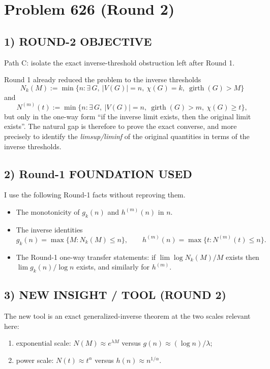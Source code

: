 \section{Problem 626 (Round 2)}

\subsection*{1) ROUND-2 OBJECTIVE}

Path C: isolate the exact inverse-threshold obstruction left after Round 1.

Round 1 already reduced the problem to the inverse thresholds
\[
N_k(M):=\min\{n:\exists\,G,\ |V(G)|=n,\ \chi(G)=k,\ \operatorname{girth}(G)>M\}
\]
and
\[
N^{(m)}(t):=\min\{n:\exists\,G,\ |V(G)|=n,\ \operatorname{girth}(G)>m,\ \chi(G)\ge t\},
\]
but only in the one-way form ``if the inverse limit exists, then the original limit exists''.
The natural gap is therefore to prove the exact converse, and more precisely to identify the
\emph{limsup/liminf} of the original quantities in terms of the inverse thresholds.

\subsection*{2) Round-1 FOUNDATION USED}

I use the following Round-1 facts without reproving them.

\begin{itemize}
\item The monotonicity of \(g_k(n)\) and \(h^{(m)}(n)\) in \(n\).
\item The inverse identities
\[
g_k(n)=\max\{M:N_k(M)\le n\},\qquad
h^{(m)}(n)=\max\{t:N^{(m)}(t)\le n\}.
\]
\item The Round-1 one-way transfer statements:
if \(\lim \log N_k(M)/M\) exists then \(\lim g_k(n)/\log n\) exists, and similarly for \(h^{(m)}\).
\end{itemize}

\subsection*{3) NEW INSIGHT / TOOL (ROUND 2)}

The new tool is an exact generalized-inverse theorem at the two scales relevant here:

\begin{enumerate}
\item exponential scale: \(N(M)\approx e^{\lambda M}\) versus \(g(n)\approx (\log n)/\lambda\);
\item power scale: \(N(t)\approx t^{\alpha}\) versus \(h(n)\approx n^{1/\alpha}\).
\end{enumerate}

